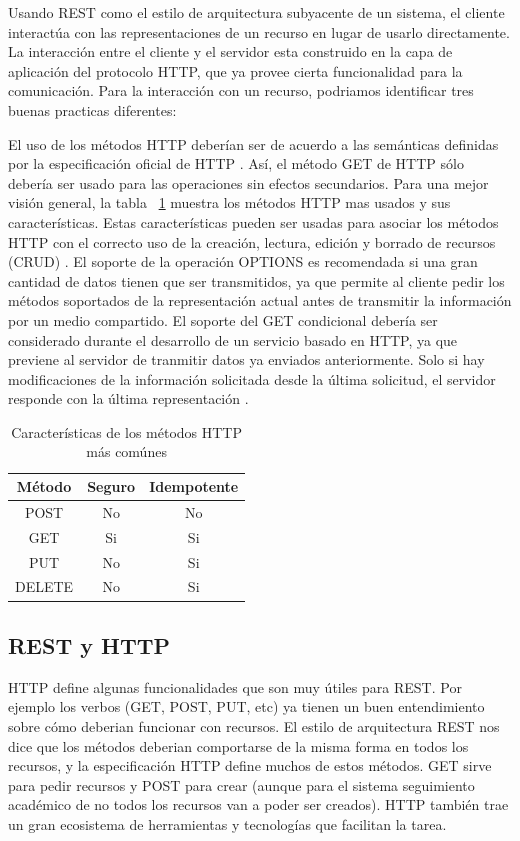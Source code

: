 Usando REST como el estilo de arquitectura subyacente de un sistema, el cliente interactúa con las representaciones de un recurso en lugar de usarlo directamente. La interacción entre el cliente y el servidor esta construido en la capa de aplicación del protocolo HTTP, que ya provee cierta funcionalidad para la comunicación. Para la interacción con un recurso, podriamos identificar tres buenas practicas diferentes:
\begin{outline}
    \1 El uso de los métodos HTTP deberían ser de acuerdo a las semánticas definidas por la especificación oficial de HTTP \cite{WAPID}. Así, el método GET de HTTP sólo debería ser usado para las operaciones sin efectos secundarios. Para una mejor visión general, la tabla ~\ref{tab:tabla_http} muestra los métodos HTTP mas usados y sus características. Estas características pueden ser usadas para asociar los métodos HTTP con el correcto uso de la creación, lectura, edición y borrado de recursos (CRUD) \cite{RVINOSKI}.
    \1 El soporte de la operación OPTIONS es recomendada si una gran cantidad de datos tienen que ser transmitidos, ya que permite al cliente pedir los métodos soportados de la representación actual antes de transmitir la información por un medio compartido. 
    \1 El soporte del GET condicional debería ser considerado durante el desarrollo de un servicio basado en HTTP, ya que previene al servidor de tranmitir datos ya enviados anteriormente. Solo si hay modificaciones de la información solicitada desde la última solicitud, el servidor responde con la última representación  \cite{RVINOSKI}.
\end{outline}

\begin{table}[!htbp]
    \centering
    \makegapedcells
    \begin{tabular}{|c|c|c|}
    \hline
    Método & Seguro & Idempotente \\ \hline
    POST & No & No \\ \hline
    GET & Si & Si \\ \hline
    PUT & No & Si \\ \hline
    DELETE & No & Si \\ \hline
    
    \end{tabular}
    \caption{Características de los métodos HTTP más comúnes}
    \label{tab:tabla_http}
\end{table}

\subsection[REST y HTTP]{REST y HTTP}
HTTP define algunas funcionalidades que son muy útiles para REST. Por ejemplo los verbos (GET, POST, PUT, etc) ya tienen un buen entendimiento sobre cómo deberian funcionar con recursos. El estilo de arquitectura REST nos dice que los métodos deberian comportarse de la misma forma en todos los recursos, y la especificación HTTP define muchos de estos métodos. 
GET sirve para pedir recursos y POST para crear (aunque para el sistema seguimiento académico de no todos los recursos van a poder ser creados).
HTTP también trae un gran ecosistema de herramientas y tecnologías que facilitan la tarea. 


